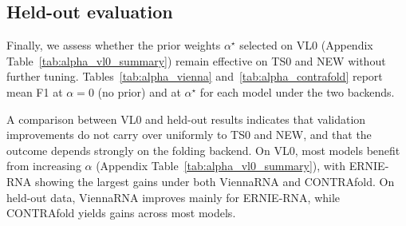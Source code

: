 \documentclass[logo,bsc,singlespacing,parskip]{infthesis}
\begin{document}
\subsection{Held-out evaluation}
Finally, we assess whether the prior weights $\alpha^\star$ selected on VL0 (Appendix Table~\ref{tab:alpha_vl0_summary}) remain effective on TS0 and NEW without further tuning. Tables~\ref{tab:alpha_vienna} and~\ref{tab:alpha_contrafold} report mean F1 at $\alpha = 0$ (no prior) and at $\alpha^\star$ for each model under the two backends.

A comparison between VL0 and held-out results indicates that validation improvements do not carry over uniformly to TS0 and NEW, and that the outcome depends strongly on the folding backend. On VL0, most models benefit from increasing $\alpha$ (Appendix Table~\ref{tab:alpha_vl0_summary}), with ERNIE-RNA showing the largest gains under both ViennaRNA and CONTRAfold. On held-out data, ViennaRNA improves mainly for ERNIE-RNA, while CONTRAfold yields gains across most models.
\end{document}
